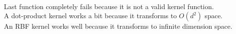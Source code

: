 \begin{answer}\\
Last function completely fails because it is not a valid kernel function.\\
A dot-product kernel works a bit because it transforms to $O(d^2)$ space.\\
An RBF kernel works well because it transforms to infinite dimension space.\\
\end{answer}
